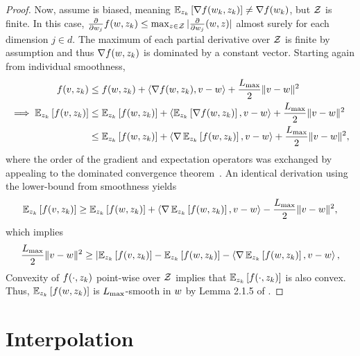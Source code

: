 \begin{proof}
    Now, assume \oracle{} is biased, meaning \( \mathbb{E}_{z_{k}}\left[\nabla f(w_k, z_{k})\right] \neq \nabla f(w_k) \), but \( \mathcal{Z} \) is finite.
    In this case, \( \frac{\partial}{\partial w_j} f(w, z_{k}) \leq \max_{z \in \mathcal{Z}} | \frac{\partial}{\partial w_j} (w, z)| \) almost surely for each dimension \( j \in d \).
    The maximum of each partial derivative over \( \mathcal{Z} \) is finite by assumption and thus \( \nabla f(w, z_{k}) \) is dominated by a constant vector.
    Starting again from individual smoothness,
    \begin{align*}
        f(v, z_{k}) &\leq f(w, z_{k}) + \left\langle\nabla f(w, z_{k}), v - w\right\rangle + \frac{L_{\text{max}}}{2} \|v - w\|^2\\
        \implies \mathbb{E}_{z_{k}} \left[f(v, z_{k})\right] &\leq \mathbb{E}_{z_{k}} \left[f(w, z_{k})\right] + \left\langle\mathbb{E}_{z_{k}} \left[\nabla f(w, z_{k})\right], v - w\right\rangle + \frac{L_{\text{max}}}{2} \|v - w\|^2\\
                                     &\leq \mathbb{E}_{z_{k}} \left[f(w, z_{k})\right] + \left\langle\nabla \, \mathbb{E}_{z_{k}} \left[f(w, z_{k})\right], v - w\right\rangle + \frac{L_{\text{max}}}{2} \|v - w\|^2,
    \end{align*}
    where the order of the gradient and expectation operators was exchanged by appealing to the dominated convergence theorem~\citep[Theorem 4.16]{ccinlar2011probability}.
    An identical derivation using the lower-bound from smoothness yields 
    \[ \mathbb{E}_{z_{k}} \left[f(v, z_{k})\right] \geq \mathbb{E}_{z_{k}} \left[f(w, z_{k})\right] + \left\langle\nabla \, \mathbb{E}_{z_{k}} \left[f(w, z_{k})\right], v - w\right\rangle - \frac{L_{\text{max}}}{2} \|v - w\|^2, \]
    which implies 
    \[ \frac{L_{\text{max}}}{2} \|v - w\|^2 \geq |\mathbb{E}_{z_{k}} \left[f(v, z_{k})\right] - \mathbb{E}_{z_{k}} \left[f(w, z_{k})\right] - \left\langle\nabla \, \mathbb{E}_{z_{k}} \left[f(w, z_{k})\right], v - w\right\rangle, \]
    Convexity of \( f(\cdot, z_{k}) \) point-wise over \( \mathcal{Z} \) implies that \( \mathbb{E}_{z_{k}} \left[f(\cdot, z_{k})\right] \) is also convex.
    Thus, \( \mathbb{E}_{z_{k}}\left[f(w, z_{k})\right] \) is \( L_{\text{max}} \)-smooth in \( w \) by Lemma 2.1.5 of \citet{nesterov2004lectures}. 
\end{proof}

\section{Interpolation}~\label{app:interpolation}

\interpolationMinima*
\interpolationGradients*
\interpolationMixed*

\hfill \break

